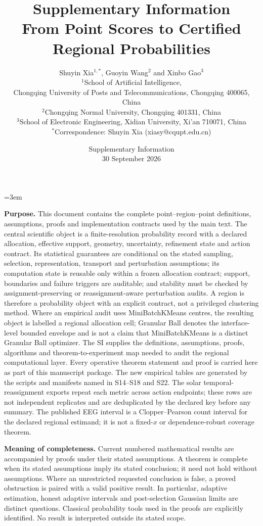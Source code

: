 \documentclass[11pt,a4paper]{article}
\title{\textbf{Supplementary Information}\\[6pt]
\large From Point Scores to Certified Regional Probabilities}
\author{Shuyin Xia$^{1,*}$, Guoyin Wang$^{2}$ and Xinbo Gao$^{3}$\\
$^{1}$School of Artificial Intelligence,\\
Chongqing University of Posts and Telecommunications, Chongqing 400065, China\\
$^{2}$Chongqing Normal University, Chongqing 401331, China\\
$^{3}$School of Electronic Engineering, Xidian University, Xi'an 710071, China\\
$^{*}$Correspondence: Shuyin Xia (xiasy@cqupt.edu.cn)}
\date{Supplementary Information\\30 September 2026}
\numberwithin{equation}{section}
\theoremstyle{definition}\newtheorem{definition}[theorem]{Definition}
\theoremstyle{remark}\newtheorem{remark}[theorem]{Remark}
\begin{document}
\emergencystretch=3em
\maketitle
\textbf{Purpose.} This document contains the complete point--region--point definitions, assumptions, proofs and implementation contracts used by the main text. The central scientific object is a finite-resolution probability record with a declared allocation, effective support, geometry, uncertainty, refinement state and action contract. Its statistical guarantees are conditional on the stated sampling, selection, representation, transport and perturbation assumptions; its computation state is reusable only within a frozen allocation contract; support, boundaries and failure triggers are auditable; and stability must be checked by assignment-preserving or reassignment-aware perturbation audits. A region is therefore a probability object with an explicit contract, not a privileged clustering method. Where an empirical audit uses MiniBatchKMeans centres, the resulting object is labelled a regional allocation cell; Granular Ball denotes the interface-level bounded envelope and is not a claim that MiniBatchKMeans is a distinct Granular Ball optimizer. The SI supplies the definitions, assumptions, proofs, algorithms and theorem-to-experiment map needed to audit the regional computational layer. Every operative theorem statement and proof is carried here as part of this manuscript package. The new empirical tables are generated by the scripts and manifests named in S14--S18 and S22. The solar temporal-reassignment exports repeat each metric across action endpoints; these rows are not independent replicates and are deduplicated by the declared key before any summary. The published EEG interval is a Clopper--Pearson count interval for the declared regional estimand; it is not a fixed-$x$ or dependence-robust coverage theorem.

\textbf{Meaning of completeness.} Current numbered mathematical results are accompanied by proofs under their stated assumptions. A theorem is complete when its stated assumptions imply its stated conclusion; it need not hold without assumptions. Where an unrestricted requested conclusion is false, a proved obstruction is paired with a valid positive result. In particular, adaptive estimation, honest adaptive intervals and post-selection Gaussian limits are distinct questions. Classical probability tools used in the proofs are explicitly identified. No result is interpreted outside its stated scope.
\end{document}
